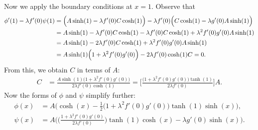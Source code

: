 \documentclass[12pt, reqno]{amsart}
\numberwithin{equation}{section}
\begin{document}
Now we apply the boundary conditions at $x = 1$. Observe that
   \begin{align} \label{system_ACsolving1}
       \phi'(1) - \lambda f'(0) \psi(1) 
       &= \Big( A \sinh(1) - \lambda f'(0) C
           \cosh(1) \Big) - 
           \lambda f'(0) \Big( C \cosh(1) - \lambda g'(0) A \sinh(1) \Big) \notag \\
       &= A \sinh(1) - \lambda f'(0) C \cosh(1) - 
          \lambda f'(0) C \cosh(1) + \lambda^2 f'(0) g'(0) A \sinh(1) \notag \\
       &= A \sinh(1) - 2\lambda f'(0) C \cosh(1) + \lambda^2 f'(0) g'(0) A \sinh(1) \notag \\
       &= A \sinh(1) \Big( 1 + \lambda^2 f'(0) g'(0) \Big) - 
       2\lambda f'(0)\cosh(1) C = 0.
   \end{align}
   From this, we obtain $C$ in terms of $A$:
   \begin{align} \label{system_eigenfunction_AC}
       C &= \frac{A \sinh(1) \Big( 1 + \lambda^2 f'(0) g'(0) \Big)}{2 \lambda f'(0) \cosh(1)}
         = \Bigg[ \frac{\Big( 1 + \lambda^2 f'(0) g'(0) \Big) \tanh(1)}{2 \lambda f'(0)} \Bigg] A.
   \end{align}
Now the forms of $\phi$ and $\psi$ simplify further:
    \begin{align}
        \phi(x) 
            &=  A \Bigg( \cosh(x) - \frac{1}{2} \Big(1+ \lambda^2 f'(0) g'(0) \Big) \tanh(1) \sinh(x) \Bigg), \label{system_phi} \\
        \psi(x) 
            &= A \Bigg( \Big( \frac{1+\lambda^2 f'(0)g'(0)}{2\lambda f'(0)} \Big) \tanh(1) \cosh(x) - \lambda g'(0) \sinh(x) \Bigg). \label{system_psi}
    \end{align}

\end{document}

